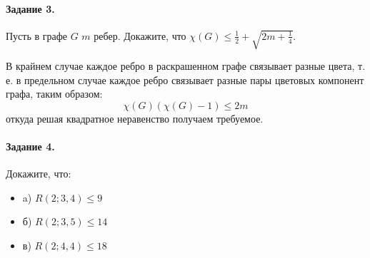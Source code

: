 \documentclass[a4paper,12pt]{article}
\begin{document}
\paragraph{Задание 3.} Пусть в графе $G$ $m$ ребер. Докажите, что $\chi \left(G\right) \le \frac{1}{2} + \sqrt{2m + \frac{1}{4}}$.

\begin{Solution}
В крайнем случае каждое ребро в раскрашенном графе связывает разные цвета, т. е. в предельном случае каждое ребро связывает разные пары цветовых компонент графа, таким образом:
\[
	\chi\left(G\right) \left(\chi\left(G\right)-1\right) \le 2m
\]
откуда решая квадратное неравенство получаем требуемое.
\end{Solution}

\paragraph{Задание 4.} Докажите, что:
\begin{itemize}
\item a) $R\left(2; 3, 4\right) \le 9$

\item б) $R\left(2; 3, 5\right) \le 14$

\item в) $R\left(2; 4, 4\right) \le 18$
\end{itemize}
\end{document}
